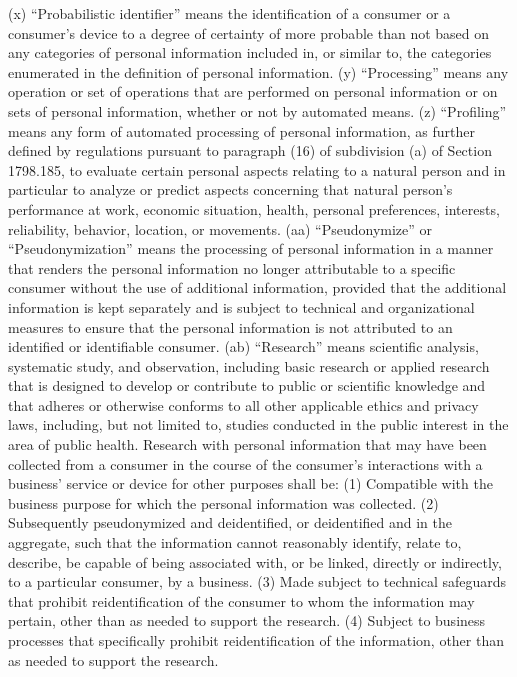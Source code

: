 (x) “Probabilistic identifier” means the identification of a consumer or a consumer’s device to a degree of certainty of more probable than not based on any categories of personal information included in, or similar to, the categories enumerated in the definition of personal information.
(y) “Processing” means any operation or set of operations that are performed on personal information or on sets of personal information, whether or not by automated means.
(z) “Profiling” means any form of automated processing of personal information, as further defined by regulations pursuant to paragraph (16) of subdivision (a) of Section 1798.185, to evaluate certain personal aspects relating to a natural person and in particular to analyze or predict aspects concerning that natural person’s performance at work, economic situation, health, personal preferences, interests, reliability, behavior, location, or movements.
(aa) “Pseudonymize” or “Pseudonymization” means the processing of personal information in a manner that renders the personal information no longer attributable to a specific consumer without the use of additional information, provided that the additional information is kept separately and is subject to technical and organizational measures to ensure that the personal information is not attributed to an identified or identifiable consumer.
(ab) “Research” means scientific analysis, systematic study, and observation, including basic research or applied research that is designed to develop or contribute to public or scientific knowledge and that adheres or otherwise conforms to all other applicable ethics and privacy laws, including, but not limited to, studies conducted in the public interest in the area of public health. Research with personal information that may have been collected from a consumer in the course of the consumer’s interactions with a business’ service or device for other purposes shall be:
(1) Compatible with the business purpose for which the personal information was collected.
(2) Subsequently pseudonymized and deidentified, or deidentified and in the aggregate, such that the information cannot reasonably identify, relate to, describe, be capable of being associated with, or be linked, directly or indirectly, to a particular consumer, by a business.
(3) Made subject to technical safeguards that prohibit reidentification of the consumer to whom the information may pertain, other than as needed to support the research.
(4) Subject to business processes that specifically prohibit reidentification of the information, other than as needed to support the research.
